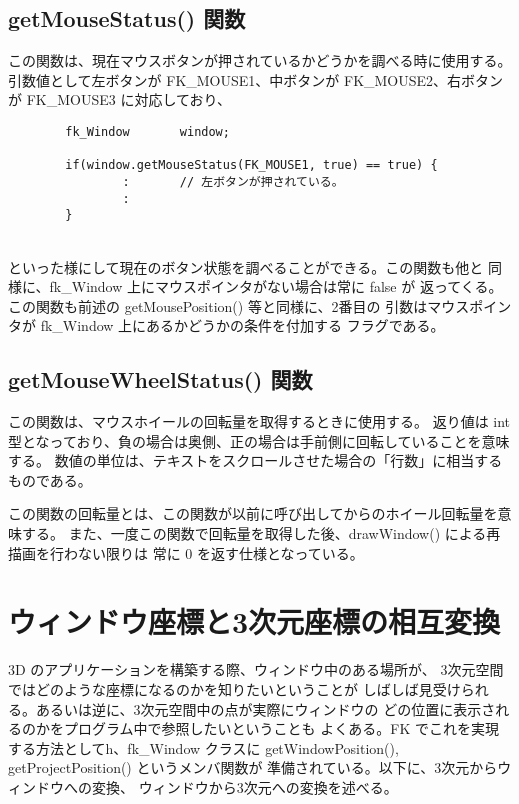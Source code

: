 \subsection*{getMouseStatus() 関数}
この関数は、現在マウスボタンが押されているかどうかを調べる時に使用する。
引数値として左ボタンが FK\_MOUSE1、中ボタンが FK\_MOUSE2、右ボタンが
FK\_MOUSE3 に対応しており、
\\
\begin{breakbox}
\begin{verbatim}
        fk_Window       window;

        if(window.getMouseStatus(FK_MOUSE1, true) == true) {
                :       // 左ボタンが押されている。
                :
        }
\end{verbatim}
\end{breakbox}
~ \\
といった様にして現在のボタン状態を調べることができる。この関数も他と
同様に、fk\_Window 上にマウスポインタがない場合は常に false が
返ってくる。この関数も前述の getMousePosition() 等と同様に、2番目の
引数はマウスポインタが fk\_Window 上にあるかどうかの条件を付加する
フラグである。

\subsection*{getMouseWheelStatus() 関数}
この関数は、マウスホイールの回転量を取得するときに使用する。
返り値は int 型となっており、負の場合は奥側、正の場合は手前側に回転していることを意味する。
数値の単位は、テキストをスクロールさせた場合の「行数」に相当するものである。

この関数の回転量とは、この関数が以前に呼び出してからのホイール回転量を意味する。
また、一度この関数で回転量を取得した後、drawWindow() による再描画を行わない限りは
常に 0 を返す仕様となっている。

\section{ウィンドウ座標と3次元座標の相互変換}
3D のアプリケーションを構築する際、ウィンドウ中のある場所が、
3次元空間ではどのような座標になるのかを知りたいということが
しばしば見受けられる。あるいは逆に、3次元空間中の点が実際にウィンドウの
どの位置に表示されるのかをプログラム中で参照したいということも
よくある。FK でこれを実現する方法としてh、fk\_Window クラスに
getWindowPosition(), getProjectPosition() というメンバ関数が
準備されている。以下に、3次元からウィンドウへの変換、
ウィンドウから3次元への変換を述べる。

